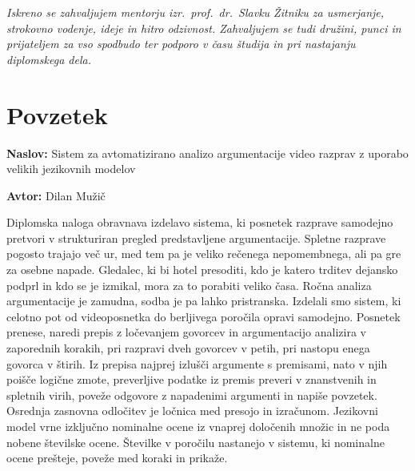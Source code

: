 \documentclass[a4paper, 12pt]{book}
\newcommand{\ttitle}{Sistem za avtomatizirano analizo argumentacije video razprav z uporabo velikih jezikovnih modelov}
\newcommand{\tauthor}{Dilan Mužič}
\newcommand{\clearemptydoublepage}{\newpage{\pagestyle{empty}\cleardoublepage}}
\begin{document}
\vfill

\vspace{2cm}
\clearemptydoublepage

\thispagestyle{empty}\mbox{}\vfill\null\it%
\noindent
Iskreno se zahvaljujem mentorju izr.\ prof.\ dr.\ Slavku Žitniku za usmerjanje,
strokovno vodenje, ideje in hitro odzivnost.
Zahvaljujem se tudi družini, punci in prijateljem za vso spodbudo ter podporo v času
študija in pri nastajanju diplomskega dela.

\rm\normalfont
\clearemptydoublepage


\pagestyle{empty}
\def\thepage{}
\tableofcontents{}

\clearemptydoublepage

\chapter*{Povzetek}

\noindent\textbf{Naslov:} \ttitle
\bigskip

\noindent\textbf{Avtor:} \tauthor
\bigskip

\noindent
Diplomska naloga obravnava izdelavo sistema, ki
posnetek razprave samodejno pretvori v strukturiran pregled predstavljene argumentacije. Spletne razprave pogosto trajajo več ur, med tem pa je veliko rečenega nepomembnega, ali pa gre za osebne napade. Gledalec, ki bi hotel presoditi, kdo je katero trditev dejansko podprl in kdo se je izmikal, mora za to porabiti veliko časa. Ročna analiza argumentacije je zamudna, sodba je pa lahko pristranska. Izdelali smo sistem, ki celotno pot od videoposnetka do berljivega poročila opravi samodejno. Posnetek prenese, naredi prepis z ločevanjem govorcev in argumentacijo analizira v zaporednih korakih, pri razpravi dveh govorcev v petih, pri nastopu enega govorca v štirih. Iz prepisa najprej izlušči argumente s premisami, nato v njih poišče logične zmote, preverljive podatke iz premis preveri v znanstvenih in spletnih virih, poveže odgovore z napadenimi argumenti in napiše povzetek. Osrednja zasnovna odločitev je ločnica med presojo in izračunom. Jezikovni model vrne izključno nominalne ocene iz vnaprej določenih množic in ne poda nobene številske ocene. Številke v poročilu nastanejo v sistemu, ki nominalne ocene prešteje, poveže med koraki in prikaže.
\end{document}
